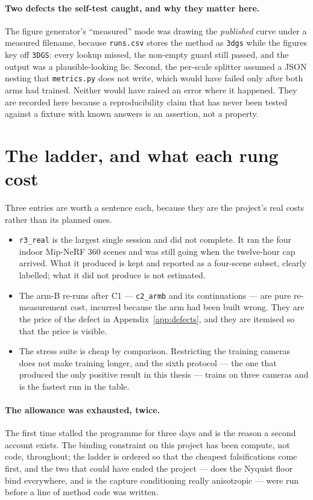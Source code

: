 \paragraph{Two defects the self-test caught, and why they matter here.} The
figure generator's ``measured'' mode was drawing the \emph{published} curve under
a measured filename, because \texttt{runs.csv} stores the method as
\texttt{3dgs} while the figures key off \texttt{3DGS}: every lookup missed, the
non-empty guard still passed, and the output was a plausible-looking lie. Second,
the per-scale splitter assumed a JSON nesting that \texttt{metrics.py} does not
write, which would have failed only after both arms had trained. Neither would
have raised an error where it happened. They are recorded here because a
reproducibility claim that has never been tested against a fixture with known
answers is an assertion, not a property.

\section{The ladder, and what each rung cost}
\label{app:ladder}



Three entries are worth a sentence each, because they are the project's real
costs rather than its planned ones.

\begin{itemize}[leftmargin=1.4em,itemsep=3pt]
  \item \texttt{r3\_real} is the largest single session and did not complete. It
        ran the four indoor Mip-NeRF 360 scenes and was still going when the
        twelve-hour cap arrived. What it produced is kept and reported as a
        four-scene subset, clearly labelled; what it did not produce is not
        estimated.
  \item The arm-B re-runs after C1 --- \texttt{c2\_armb} and its continuations
        --- are pure re-measurement cost, incurred because the arm had been built
        wrong. They are the price of the defect in Appendix~\ref{app:defects},
        and they are itemised so that the price is visible.
  \item The stress suite is cheap by comparison. Restricting the training cameras
        does not make training longer, and the sixth protocol --- the one that
        produced the only positive result in this thesis --- trains on three
        cameras and is the fastest run in the table.
\end{itemize}

\paragraph{The allowance was exhausted, twice.} The first time stalled the
programme for three days and is the reason a second account exists. The binding
constraint on this project has been compute, not code, throughout; the ladder is
ordered so that the cheapest falsifications come first, and the two that could
have ended the project --- does the Nyquist floor bind everywhere, and is the
capture conditioning really anisotropic --- were run before a line of method code
was written.
